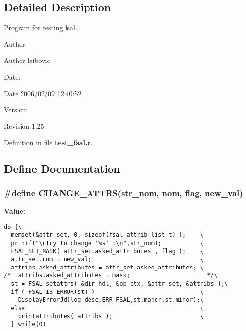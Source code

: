\subsection{Detailed Description}
Program for testing fsal. 

\begin{Desc}
\item[Author:]\end{Desc}
\begin{Desc}
\item[Author]leibovic \end{Desc}
\begin{Desc}
\item[Date:]\end{Desc}
\begin{Desc}
\item[Date]2006/02/09 12:40:52 \end{Desc}
\begin{Desc}
\item[Version:]\end{Desc}
\begin{Desc}
\item[Revision]1.25 \end{Desc}


Definition in file {\bf test\_\-fsal.c}.

\subsection{Define Documentation}
\subsubsection[{CHANGE\_\-ATTRS}]{\setlength{\rightskip}{0pt plus 5cm}\#define CHANGE\_\-ATTRS(str\_\-nom, \/  nom, \/  flag, \/  new\_\-val)}\label{test__fsal_8c_73abd6e98454080c0b9aec2922f9694a}


\textbf{Value:}

\begin{Code}\begin{verbatim}do {\
  memset(&attr_set, 0, sizeof(fsal_attrib_list_t) );    \
  printf("\nTry to change '%s' :\n",str_nom);           \
  FSAL_SET_MASK( attr_set.asked_attributes , flag );    \
  attr_set.nom = new_val;                               \
  attribs.asked_attributes = attr_set.asked_attributes; \
/*  attribs.asked_attributes = mask;                      */\
  st = FSAL_setattrs( &dir_hdl, &op_ctx, &attr_set, &attribs );\
  if ( FSAL_IS_ERROR(st) )                              \
    DisplayErrorJd(log_desc,ERR_FSAL,st.major,st.minor);\
  else                                                  \
    printattributes( attribs );                         \
  } while(0)
\end{verbatim}
\end{Code}
